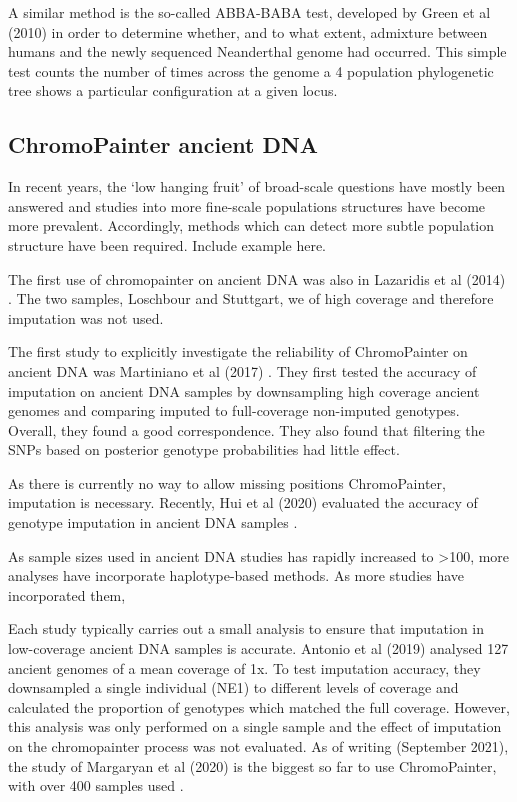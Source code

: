 A similar method is the so-called ABBA-BABA test, developed by Green et al (2010) \cite{Green2010} in order to determine whether, and to what extent, admixture between humans and the newly sequenced Neanderthal genome had occurred. This simple test counts the number of times across the genome a 4 population phylogenetic tree shows a particular configuration at a given locus.   

\subsection{ChromoPainter ancient DNA}

In recent years, the `low hanging fruit' of broad-scale questions have mostly been answered and studies into more fine-scale populations structures have become more prevalent. Accordingly, methods which can detect more subtle population structure have been required. Include example here. 

The first use of chromopainter on ancient DNA was also in Lazaridis et al (2014) \cite{Lazaridis2014}. The two samples, Loschbour and Stuttgart, we of high coverage and therefore imputation was not used.

The first study to explicitly investigate the reliability of ChromoPainter on ancient DNA was Martiniano et al (2017) \cite{Martiniano2017}. They first tested the accuracy of imputation on ancient DNA samples by downsampling high coverage ancient genomes and comparing imputed to full-coverage non-imputed genotypes. Overall, they found a good correspondence. They also found that filtering the SNPs based on posterior genotype probabilities had little effect. 

As there is currently no way to allow missing positions ChromoPainter, imputation is necessary. Recently, Hui et al (2020) evaluated the accuracy of genotype imputation in ancient DNA samples \cite{hui2020evaluating}. 

As sample sizes used in ancient DNA studies has rapidly increased to >100, more analyses have incorporate haplotype-based methods. As more studies have incorporated them, 

Each study typically carries out a small analysis to ensure that imputation in low-coverage ancient DNA samples is accurate. Antonio et al (2019) \cite{antonio2019ancient} analysed 127 ancient genomes of a mean coverage of 1x. To test imputation accuracy, they downsampled a single individual (NE1) to different levels of coverage and calculated the proportion of genotypes which matched the full coverage. However, this analysis was only performed on a single sample and the effect of imputation on the chromopainter process was not evaluated. As of writing (September 2021), the study of Margaryan et al (2020) is the biggest so far to use ChromoPainter, with over 400 samples used \cite{margaryan2020population}.

